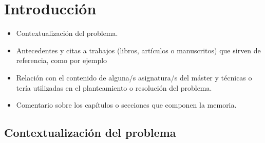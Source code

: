 \documentclass[a4paper,12pt]{report}
\begin{document}
\pagestyle{fancy}
\fancyhead{} %
\setlength\headheight{21.2pt}

\renewcommand{\tablename}{\textbf{Tabla}} %
\renewcommand{\figurename}{\textbf{Figura}} %
\renewcommand{\listtablename}{Índice de tablas}

\title{}
\date{}
\maketitle


\clearpage
{}
\setcounter{page}{1}

\tableofcontents

\listoffigures

\listoftables


\clearpage
{}
\setcounter{page}{1}


\chapter{Introducción}

\begin{itemize}

\item Contextualización del problema.

\item Antecedentes y citas a trabajos (libros, artículos o manuscritos) que sirven de referencia, como por ejemplo \cite{DindosPipherRule2016}

\item Relación con el contenido de alguna/s asignatura/s del máster y técnicas o tería utilizadas en el planteamiento o resolución del problema.

\item Comentario sobre los capítulos o secciones que componen la memoria.

\end{itemize}

\section{Contextualización del problema}
\end{document}

